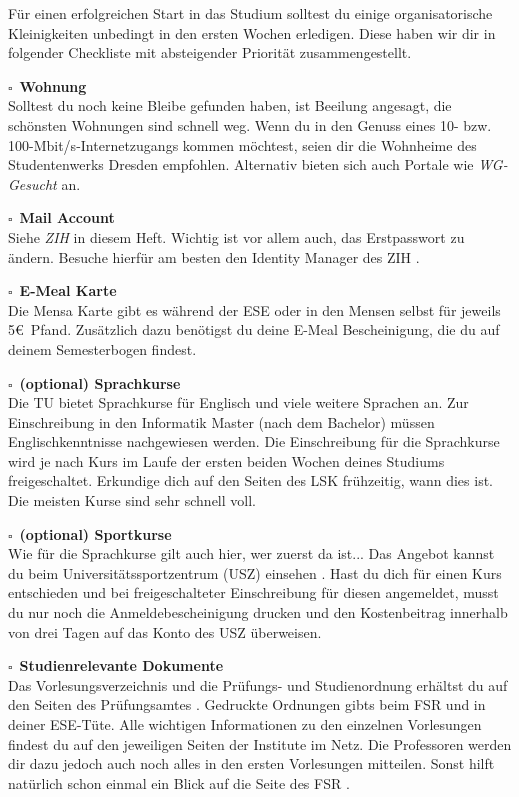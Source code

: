 \newcommand{\checkbox}[1]{$\square$\ \textbf{#1} \\}


Für einen erfolgreichen Start in das Studium solltest du einige organisatorische Kleinigkeiten unbedingt in den ersten Wochen erledigen.
Diese haben wir dir in folgender Checkliste mit absteigender Priorität zusammengestellt.

\checkbox{Wohnung}
Solltest du noch keine Bleibe gefunden haben, ist Beeilung angesagt, die schönsten Wohnungen sind schnell weg.
Wenn du in den Genuss eines 10- bzw. 100-Mbit/s-Internetzugangs kommen möchtest, seien dir die Wohnheime  des Studentenwerks Dresden empfohlen. Alternativ bieten sich auch Portale wie \textit{WG-Gesucht}  an.

\checkbox{Mail Account}
Siehe \textit{ZIH} in diesem Heft. Wichtig ist vor allem auch, das Erstpasswort zu ändern. Besuche hierfür am besten den Identity Manager des ZIH .

\checkbox{E-Meal Karte}
Die Mensa Karte gibt es während der ESE oder in den Mensen selbst für jeweils 5\euro\ Pfand.
Zusätzlich dazu benötigst du deine E-Meal Bescheinigung, die du auf deinem Semesterbogen findest.

\checkbox{(optional) Sprachkurse}
Die TU bietet Sprachkurse für Englisch und viele weitere Sprachen an. Zur Einschreibung in den Informatik Master (nach dem Bachelor) müssen Englischkenntnisse nachgewiesen werden. Die Einschreibung für die Sprachkurse wird je nach Kurs im Laufe der ersten beiden Wochen deines Studiums freigeschaltet.
Erkundige dich auf den Seiten des LSK  frühzeitig, wann dies ist. Die meisten Kurse sind sehr schnell voll.

\checkbox{(optional) Sportkurse}
Wie für die Sprachkurse gilt auch hier, wer zuerst da ist...
Das Angebot kannst du beim Universitätssportzentrum (USZ) einsehen .
Hast du dich für einen Kurs entschieden und bei freigeschalteter Einschreibung für diesen angemeldet, musst du nur noch die Anmeldebescheinigung drucken und den Kostenbeitrag innerhalb von drei Tagen auf das Konto des USZ überweisen.

\checkbox{Studienrelevante Dokumente}
Das Vorlesungsverzeichnis und die Prüfungs- und Studienordnung erhältst du auf den Seiten des Prüfungsamtes .
Gedruckte Ordnungen gibts beim FSR und in deiner ESE-Tüte.
Alle wichtigen Informationen zu den einzelnen Vorlesungen findest du auf den jeweiligen Seiten der Institute im Netz.
Die Professoren werden dir dazu jedoch auch noch alles in den ersten Vorlesungen mitteilen. Sonst hilft natürlich schon einmal ein Blick auf die Seite des FSR .

